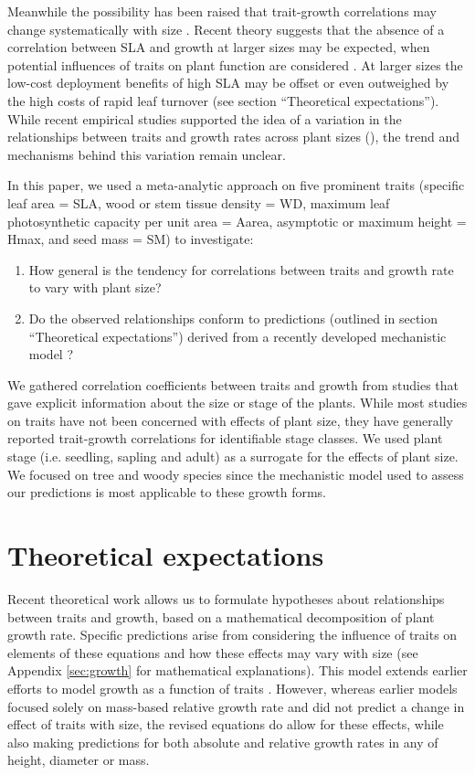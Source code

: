\documentclass[a4paper,11pt]{article}
\begin{document}
Meanwhile the possibility has been raised that trait-growth correlations may change systematically with size \citep{Falster:2011ii, Ruger:2012jv, Iida:2014ep, Iida:2014hq}. Recent theory suggests that the absence of a correlation between SLA and growth at larger sizes may be expected, when potential influences of traits on plant function are considered \citep{Falster:2011ii}. At larger sizes the low-cost deployment benefits of high SLA may be offset or even outweighed by the high costs of rapid leaf turnover (see section ``Theoretical expectations''). While recent empirical studies supported the idea of a variation in the relationships between traits and growth rates across plant sizes (\citealt{Iida:2014ep, Iida:2014hq}), the trend and mechanisms behind this variation remain unclear. 

In this paper, we used a meta-analytic approach on five prominent traits (specific leaf area = SLA, wood or stem tissue density = WD, maximum leaf photosynthetic capacity per unit area = Aarea, asymptotic or maximum height = Hmax, and seed mass = SM) to investigate:
\begin{enumerate}
  \item How general is the tendency for correlations between traits and growth rate to vary with plant size?
  \item  Do the observed relationships conform to predictions (outlined in section ``Theoretical expectations'') derived from a recently developed mechanistic model \citep{Falster:2011ii}?
\end{enumerate}
We gathered correlation coefficients between traits and growth from studies that gave explicit information about the size or stage of the plants. While most studies on traits have not been concerned with effects of plant size, they have generally reported trait-growth correlations for identifiable stage classes. We used plant stage (i.e. seedling, sapling and adult) as a surrogate for the effects of plant size. We focused on tree and woody species since the mechanistic model used to assess our predictions is most applicable to these growth forms.

\section*{Theoretical expectations}\label{theory}

Recent theoretical work \citep{Falster:2011ii} allows us to formulate hypotheses about relationships between traits and growth, based on a mathematical decomposition of plant growth rate. Specific predictions arise from considering the influence of traits on elements of these equations and how these effects may vary with size (see Appendix \ref{sec:growth} for mathematical explanations). This model extends earlier efforts to model growth as a function of traits \citep{Lambers:1992bj,cornelissen_seedling_1996,Wright:2000kw,Enquist:2007ek}. However, whereas earlier models focused solely on mass-based relative growth rate and did not predict a change in effect of traits with size, the revised equations do allow for these effects, while also making predictions for both absolute and relative growth rates in any of height, diameter or mass.
\end{document}
